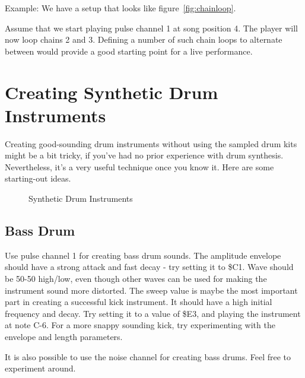 Example: We have a setup that looks like figure~\ref{fig:chainloop}.

Assume that we start playing pulse channel 1 at song position 4. The player will now loop chains 2 and 3. Defining a number of such chain loops to alternate between would provide a good starting point for a live performance.

\section{Creating Synthetic Drum Instruments}

Creating good-sounding drum instruments without using the sampled drum kits might be a bit tricky, if you've had no prior experience with drum synthesis. Nevertheless, it's a very useful technique once you know it. Here are some starting-out ideas.

\begin{figure}[hbtp]
	\centering
	\qquad

	\qquad

	\qquad

	\caption{Synthetic Drum Instruments}
	\label{fig:instr-examples}
\end{figure}

\subsection{Bass Drum}

Use pulse channel 1 for creating bass drum sounds. The amplitude envelope should have a strong attack and fast decay - try setting it to \$C1. Wave should be 50-50 high/low, even though other waves can be used for making the instrument sound more distorted. The sweep value is maybe the most important part in creating a successful kick instrument. It should have a high initial frequency and decay. Try setting it to a value of \$E3, and playing the instrument at note C-6. For a more snappy sounding kick, try experimenting with the envelope and length parameters.

It is also possible to use the noise channel for creating bass drums. Feel free to experiment around.

